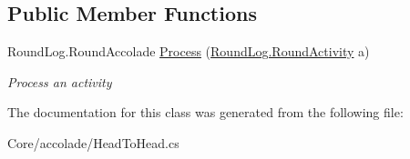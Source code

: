 \subsection*{Public Member Functions}
\begin{DoxyCompactItemize}
\item 
\hypertarget{class_m_b_c_1_1_core_1_1mbc_1_1accolade_1_1_head_to_head_afd0bb6e5b731cdd4a638a0b91445193f}{Round\-Log.\-Round\-Accolade \hyperlink{class_m_b_c_1_1_core_1_1mbc_1_1accolade_1_1_head_to_head_afd0bb6e5b731cdd4a638a0b91445193f}{Process} (\hyperlink{class_m_b_c_1_1_core_1_1_round_log_1_1_round_activity}{Round\-Log.\-Round\-Activity} a)}\label{class_m_b_c_1_1_core_1_1mbc_1_1accolade_1_1_head_to_head_afd0bb6e5b731cdd4a638a0b91445193f}

\begin{DoxyCompactList}\small\item\em Process an activity\end{DoxyCompactList}\end{DoxyCompactItemize}


The documentation for this class was generated from the following file\-:\begin{DoxyCompactItemize}
\item 
Core/accolade/Head\-To\-Head.\-cs\end{DoxyCompactItemize}
